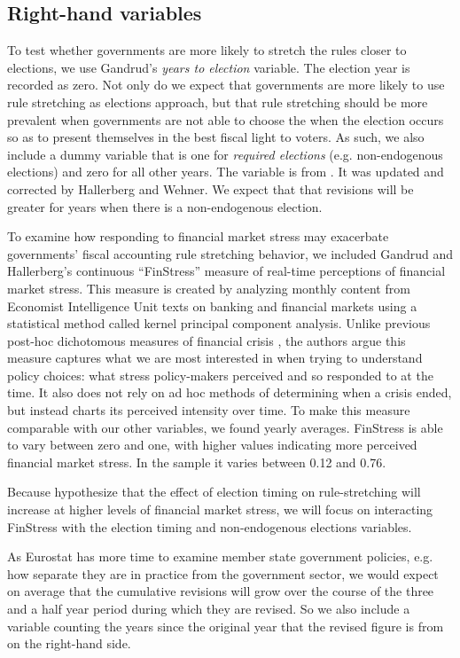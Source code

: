 \documentclass[]{article}
\begin{document}
\subsection{Right-hand variables}

To test whether governments are more likely to stretch the rules closer to elections, we use Gandrud's \citeyearpar{gandrudYrcurnt} \emph{years to election} variable. The election year is recorded as zero. Not only do we expect that governments are more likely to use rule stretching as elections approach, but that rule stretching should be more prevalent when governments are not able to choose the when the election occurs so as to present themselves in the best fiscal light to voters. As such, we also include a dummy variable that is one for \emph{required elections} (e.g. non-endogenous elections) and zero for all other years. The variable is from \cite{Brender2008}. It was updated and corrected by Hallerberg and Wehner. We expect that that revisions will be greater for years when there is a non-endogenous election.

To examine how responding to financial market stress may exacerbate governments' fiscal accounting rule stretching behavior, we included Gandrud and Hallerberg's \citeyearpar{finstress_paper} continuous ``FinStress'' measure of real-time perceptions of financial market stress. This measure is created by analyzing monthly content from Economist Intelligence Unit texts on banking and financial markets using a statistical method called kernel principal component analysis. Unlike previous post-hoc dichotomous measures of financial crisis \citep[e.g. measures compiled by][]{Laeven2012,ReinhartRog2010}, the authors argue this measure captures what we are most interested in when trying to understand policy choices: what stress policy-makers perceived and so responded to at the time. It also does not rely on ad hoc methods of determining when a crisis ended, but instead charts its perceived intensity over time. To make this measure comparable with our other variables, we found yearly averages. FinStress is able to vary between zero and one, with higher values indicating more perceived financial market stress. In the sample it varies between 0.12 and 0.76.

Because hypothesize that the effect of election timing on rule-stretching will increase at higher levels of financial market stress, we will focus on interacting FinStress with the election timing and non-endogenous elections variables.

As Eurostat has more time to examine member state government policies, e.g. how separate they are in practice from the government sector, we would expect on average that the cumulative revisions will grow over the course of the three and a half year period during which they are revised. So we also include a variable counting the years since the original year that the revised figure is from on the right-hand side.
\end{document}
